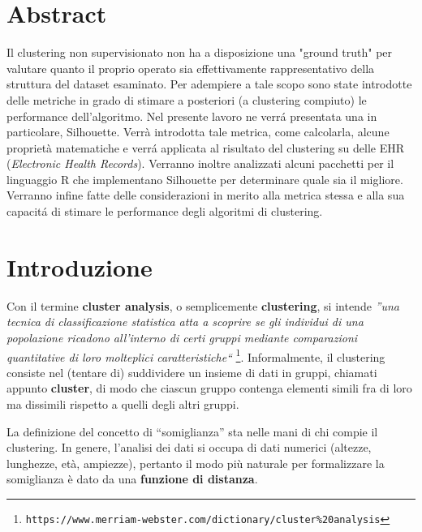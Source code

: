 \documentclass[a4paper, 12pt]{report}
\begin{document}
	\tableofcontents
	\thispagestyle{empty}

	\listoffigures
	\thispagestyle{empty}
	\clearpage

	\chapter*{Abstract}
	\thispagestyle{empty}

		Il clustering non supervisionato non ha a disposizione una "ground
		truth" per valutare quanto il proprio operato sia effettivamente
		rappresentativo della struttura del dataset esaminato. Per adempiere
		a tale scopo sono state introdotte delle metriche in grado di stimare
		a posteriori (a clustering compiuto) le performance dell'algoritmo.
		Nel presente lavoro ne verrá presentata una in particolare, Silhouette.
		Verrà introdotta tale metrica, come calcolarla, alcune proprietà
		matematiche e verrá applicata al risultato del clustering su delle
		EHR (\textit{Electronic Health Records}). Verranno inoltre analizzati
		alcuni pacchetti per il linguaggio R che implementano Silhouette per
		determinare quale sia il migliore. Verranno infine fatte delle
		considerazioni in merito alla metrica stessa e alla sua capacitá
		di stimare le performance degli algoritmi di clustering.

	\chapter{Introduzione}
	\setcounter{page}{1}

		Con il termine \textbf{cluster analysis}, o semplicemente
		\textbf{clustering}, si intende \emph{''una tecnica di
		classificazione statistica atta a scoprire se gli individui
		di una popolazione ricadono all'interno di certi gruppi mediante
		comparazioni quantitative di loro molteplici caratteristiche``}
		\footnote{\texttt{https://www.merriam-webster.com/dictionary/cluster\%20analysis}}.
		Informalmente, il clustering consiste nel (tentare di) suddividere
		un insieme di dati in gruppi, chiamati appunto \textbf{cluster},
		di modo che ciascun gruppo contenga elementi simili fra di loro
		ma dissimili rispetto a quelli degli altri gruppi.

		La definizione del concetto di ``somiglianza'' sta nelle mani di
		chi compie il clustering. In genere, l'analisi dei dati si occupa
		di dati numerici (altezze, lunghezze, età, ampiezze), pertanto il
		modo più naturale per formalizzare la somiglianza è dato da una
		\textbf{funzione di distanza}.
\end{document}
